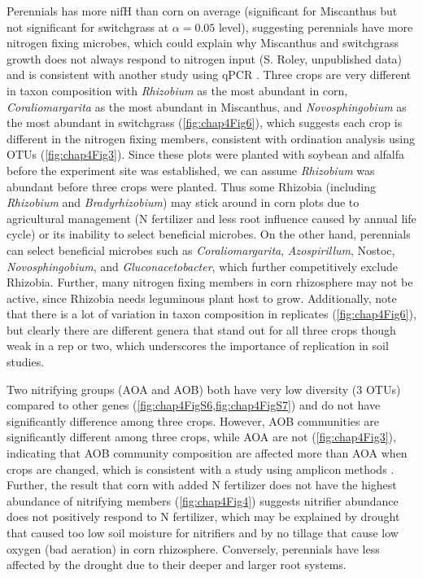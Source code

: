 \documentclass[]{msu-thesis}
\begin{document}
Perennials has more nifH than corn on average (significant for Miscanthus but not significant for switchgrass at $\alpha = 0.05$ level), suggesting perennials have more nitrogen fixing microbes, which could explain why Miscanthus and switchgrass growth does not always respond to nitrogen input \cite{schwarz_effect_1994,parrish_biology_2005} (S. Roley, unpublished data) and is consistent with another study using qPCR \cite{mao_impact_2013}. Three crops are very different in taxon composition with \textit{Rhizobium} as the most abundant in corn, \textit{Coraliomargarita} as the most abundant in Miscanthus, and \textit{Novosphingobium} as the most abundant in switchgrass (\cref{fig:chap4Fig6}), which suggests each crop is different in the nitrogen fixing members, consistent with ordination analysis using OTUs (\cref{fig:chap4Fig3}). Since these plots were planted with soybean and alfalfa before the experiment site was established, we can assume \textit{Rhizobium} was abundant before three crops were planted. Thus some Rhizobia (including \textit{Rhizobium} and \textit{Bradyrhizobium}) may stick around in corn plots due to agricultural management (N fertilizer and less root influence caused by annual life cycle) or its inability to select beneficial microbes. On the other hand, perennials can select beneficial microbes such as \textit{Coraliomargarita}, \textit{Azospirillum}, Nostoc, \textit{Novosphingobium}, and \textit{Gluconacetobacter}, which further competitively exclude Rhizobia. Further, many nitrogen fixing members in corn rhizosphere may not be active, since Rhizobia needs leguminous plant host to grow. Additionally, note that there is a lot of variation in taxon composition in replicates (\cref{fig:chap4Fig6}), but clearly there are different genera that stand out for all three crops though weak in a rep or two, which underscores the importance of replication in soil studies.

Two nitrifying groups (AOA and AOB) both have very low diversity (3 OTUs) compared to other genes (\cref{fig:chap4FigS6,fig:chap4FigS7}) and do not have significantly difference among three crops. However, AOB communities are significantly different among three crops, while AOA are not (\cref{fig:chap4Fig3}), indicating that AOB community composition are affected more than AOA when crops are changed, which is consistent with a study using amplicon methods \cite{shen_abundance_2008,wang_community_2009}. Further, the result that corn with added N fertilizer does not have the highest abundance of nitrifying members (\cref{fig:chap4Fig4}) suggests nitrifier abundance does not positively respond to N fertilizer, which may be explained by drought that caused too low soil moisture for nitrifiers \cite{di_effect_2014} and by no tillage that cause low oxygen (bad aeration) in corn rhizosphere. Conversely, perennials have less affected by the drought due to their deeper and larger root systems.
\end{document}
